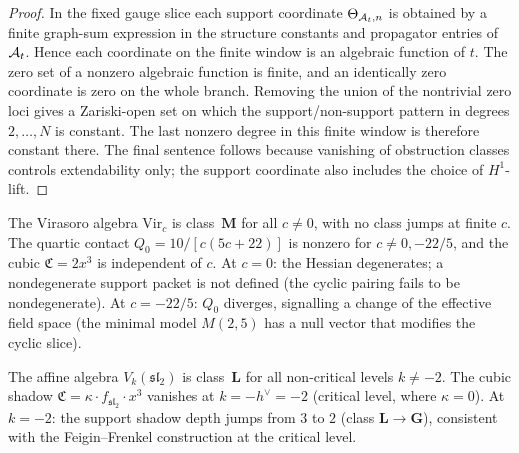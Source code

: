 \begin{proof}
In the fixed gauge slice each support coordinate
\(\Theta_{\mathcal{A}_t,n}\) is obtained by a finite graph-sum expression
in the structure constants and propagator entries of \(\mathcal{A}_t\).
Hence each coordinate on the finite window is an algebraic function
of \(t\). The zero set of a nonzero algebraic function is finite,
and an identically zero coordinate is zero on the whole branch.
Removing the union of the nontrivial zero loci gives a Zariski-open
set on which the support/non-support pattern in degrees \(2,\ldots,N\)
is constant. The last nonzero degree in this finite window is
therefore constant there. The final sentence follows because
vanishing of obstruction classes controls extendability only; the
support coordinate also includes the choice of \(H^1\)-lift.
\end{proof}

\begin{example}
The Virasoro algebra $\mathrm{Vir}_c$ is class~$\mathbf{M}$
for all $c \neq 0$, with no class jumps at finite $c$.
The quartic contact $Q_0 = 10/[c(5c+22)]$ is nonzero for
$c \neq 0, -22/5$, and the cubic $\mathfrak{C} = 2x^3$ is
independent of $c$. At $c = 0$: the Hessian degenerates;
a nondegenerate support packet is not defined (the cyclic pairing
fails to be nondegenerate). At $c = -22/5$: $Q_0$ diverges, signalling
a change of the effective field space (the minimal model
$M(2,5)$ has a null vector that modifies the cyclic slice).
\end{example}

\begin{example}
The affine algebra $V_k(\mathfrak{sl}_2)$ is class~$\mathbf{L}$
for all non-critical levels $k \neq -2$. The cubic shadow
$\mathfrak{C} = \kappa \cdot f_{\mathfrak{sl}_2}\cdot x^3$
vanishes at $k = -h^\vee = -2$ (critical level, where
$\kappa = 0$). At $k = -2$: the support shadow depth jumps from
$3$ to $2$ (class $\mathbf{L} \to \mathbf{G}$), consistent
with the Feigin--Frenkel construction at the critical level.
\end{example}



